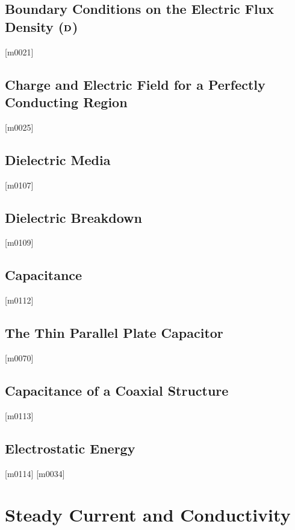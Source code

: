 \documentclass[10pt,letterpaper,twocolumn,openany]{book}
\theoremstyle{definition} %
\begin{document}
    \section{Boundary Conditions on the Electric Flux Density (${\bf D}$)}
{\color{blue}\tiny[m0021]}      
      \vfill\break
    \section{Charge and Electric Field for a Perfectly Conducting Region}
{\color{blue}\tiny[m0025]}      
      \vfill\break
    \section{Dielectric Media}
{\color{blue}\tiny[m0107]}      
      \vfill\break
    \section{Dielectric Breakdown}
{\color{blue}\tiny[m0109]}      
      \vfill\break
    \section{Capacitance}
{\color{blue}\tiny[m0112]}      
      \vfill\break
    \section{The Thin Parallel Plate Capacitor}
{\color{blue}\tiny[m0070]}      
      \vfill\break
    \section{Capacitance of a Coaxial Structure}
{\color{blue}\tiny[m0113]}      
      \vfill\break
    \section{Electrostatic Energy}
{\color{blue}\tiny[m0114]}      
{\color{blue}\tiny[m0034]}    
  \chapter{Steady Current and Conductivity}
  \thispagestyle{fancy} %
  \fancyhf{}            %
\end{document}

